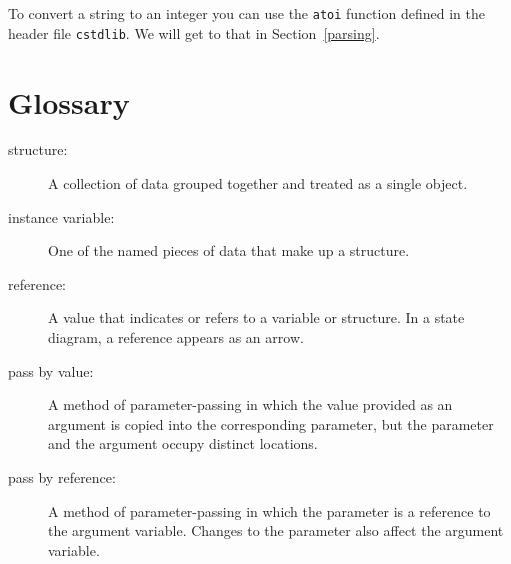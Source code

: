 To convert a string to an integer you can use the {\tt atoi}
function defined in the header file {\tt cstdlib}.  We will
get to that in Section~\ref{parsing}.

\section{Glossary}

\begin{description}

\item[structure:]  A collection of data grouped together and
treated as a single object.

\item[instance variable:]  One of the named pieces of data that make up
a structure.

\item[reference:]  A value that indicates or refers to a variable
or structure.  In a state diagram, a reference appears as an arrow.

\item[pass by value:]  A method of parameter-passing in which the
value provided as an argument is copied into the corresponding
parameter, but the parameter and the argument occupy distinct
locations.

\item[pass by reference:]  A method of parameter-passing in which
the parameter is a reference to the argument variable.  Changes
to the parameter also affect the argument variable.


\end{description}

